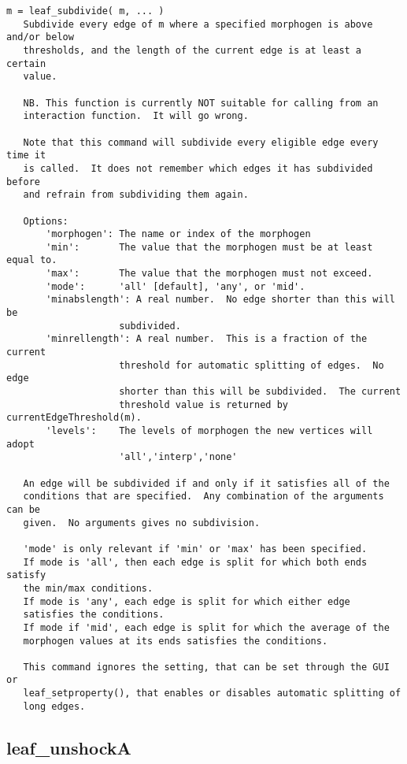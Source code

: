 \begin{verbatim}
m = leaf_subdivide( m, ... )
   Subdivide every edge of m where a specified morphogen is above and/or below
   thresholds, and the length of the current edge is at least a certain
   value.

   NB. This function is currently NOT suitable for calling from an
   interaction function.  It will go wrong.

   Note that this command will subdivide every eligible edge every time it
   is called.  It does not remember which edges it has subdivided before
   and refrain from subdividing them again.

   Options:
       'morphogen': The name or index of the morphogen
       'min':       The value that the morphogen must be at least equal to.
       'max':       The value that the morphogen must not exceed.
       'mode':      'all' [default], 'any', or 'mid'.
       'minabslength': A real number.  No edge shorter than this will be
                    subdivided.
       'minrellength': A real number.  This is a fraction of the current
                    threshold for automatic splitting of edges.  No edge
                    shorter than this will be subdivided.  The current
                    threshold value is returned by currentEdgeThreshold(m).
       'levels':    The levels of morphogen the new vertices will adopt
                    'all','interp','none'

   An edge will be subdivided if and only if it satisfies all of the
   conditions that are specified.  Any combination of the arguments can be
   given.  No arguments gives no subdivision.

   'mode' is only relevant if 'min' or 'max' has been specified.
   If mode is 'all', then each edge is split for which both ends satisfy
   the min/max conditions.
   If mode is 'any', each edge is split for which either edge
   satisfies the conditions.
   If mode if 'mid', each edge is split for which the average of the
   morphogen values at its ends satisfies the conditions.

   This command ignores the setting, that can be set through the GUI or
   leaf_setproperty(), that enables or disables automatic splitting of
   long edges.
\end{verbatim}

\subsection{leaf\_unshockA}\label{section-leaf-unshockA}

